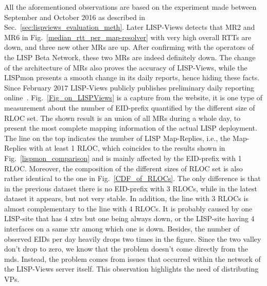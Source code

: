 All the aforementioned observations are based on the experiment made between
September and October 2016 as described in Sec.~\ref{sec:lispviews_evaluation_meth}.
Later LISP-Views detects that MR2 and MR6 in
Fig.~\ref{median_rtt_per_map-resolver} with very high overall RTTs are down,
and three new other MRs are up. After confirming with the operators of the LISP
Beta Network, these two MRs are indeed definitely down. The change of the
architecture of MRs also proves the accuracy of LISP-Views, while the LISPmon
presents a smooth change in its daily reports, hence hiding these facts. Since
February $2017$ LISP-Views publicly publishes preliminary daily reporting
online~\cite{lispviews}. %
Fig.~\ref{Fig_on_LISPViews} is a capture from the website, it is one type of measurement about the number of EID-prefix
quantified by the different size of RLOC set. The shown result is an union of
all MRs during a whole day, to present the most complete mapping information of
the actual LISP deployment. The line on the top indicates the number of LISP
Map-Replies, i.e., the Map-Replies with at least 1 RLOC, which coincides to
the results shown in Fig.~\ref{lispmon_comparison} and is mainly affected by
the EID-prefix with 1 RLOC.  Moreover, the composition of the different sizes
of RLOC set is also rather identical to the one in Fig.~\ref{CDF_of_RLOCs}. The
only difference is that in the previous dataset there is no EID-prefix with 3
RLOCs, while in the latest dataset it appears, but not very stable. In
addition, the line with 3 RLOCs is almost complementary to the line with 4
RLOCs. It is probably caused by one LISP-site that has 4 \acrshort{xtr}s but one being
always down, or the LISP-site having 4 interfaces on a same \acrshort{xtr} among which
one is down. Besides, the number of observed EIDs per day heavily drops two
times in the figure. Since the two valley don't drop to zero, we know that the
problem doesn't come directly from the \acrshort{mds}. Instead, the problem comes from
issues that occurred within the network of the LISP-Views server itself. This
observation highlights the need of distributing VPs.


